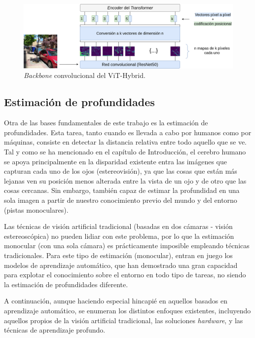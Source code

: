 \begin{figure}[H]
\centering
\includegraphics[width=1\linewidth]{imagenes/vit-hybrid.png} 
\captionsetup{width=.8\linewidth}
\caption{\textit{Backbone} convolucional del ViT-Hybrid.}
\label{fig:hybrid-vit}
\end{figure}

\subsection{Estimación de profundidades}
Otra de las bases fundamentales de este trabajo es la estimación de profundidades. Esta tarea, tanto cuando es llevada a cabo por humanos como por máquinas, consiste en detectar la distancia relativa entre todo aquello que se ve. Tal y como se ha mencionado en el capítulo de Introducción, el cerebro humano se apoya principalmente en la disparidad existente entra las imágenes que capturan cada uno de los ojos (estereovisión), ya que las cosas que están más lejanas ven su posición menos alterada entre la vista de un ojo y de otro que las cosas cercanas. Sin embargo, también capaz de estimar la profundidad en una sola imagen a partir de nuestro conocimiento previo del mundo y del entorno (pistas monoculares). 

Las técnicas de visión artificial tradicional (basadas en dos cámaras - visión estereoscópica) no pueden lidiar con este problema, por lo que la estimación monocular (con una sola cámara) es prácticamente imposible empleando técnicas tradicionales. Para este tipo de estimación (monocular), entran en juego los modelos de aprendizaje automático, que han demostrado una gran capacidad para explotar el conocimiento sobre el entorno en todo tipo de tareas, no siendo la estimación de profundidades diferente. 

A continuación, aunque haciendo especial hincapié en aquellos basados en aprendizaje automático, se enumeran los distintos enfoques existentes, incluyendo aquellos propios de la visión artificial tradicional, las soluciones \textit{hardware}, y las técnicas de aprendizaje profundo.

